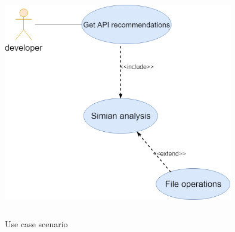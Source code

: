 \begin{figure}[H]
\includegraphics[width=10cm,height=10cm,keepaspectratio]{images/Usecase.png}
\centering
\caption{Use case scenario}
\label{fig:cmd}
\end{figure}

